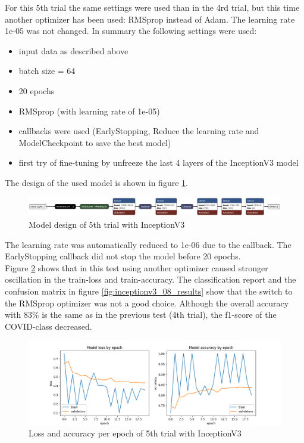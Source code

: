 \documentclass{article}
\begin{document}
For this 5th trial the same settings were used than in the 4rd trial, but this time another optimizer has been used: RMSprop instead of Adam. The learning rate 1e-05 was not changed. 
In summary the following settings were used: 
\begin{itemize}
\item input data as described above
\item batch size = 64
\item 20 epochs 
\item RMSprop (with learning rate of 1e-05)
\item callbacks were used (EarlyStopping, Reduce the learning rate and ModelCheckpoint to save the best model)
\item first try of fine-tuning by unfreeze the last 4 layers of the InceptionV3 model
\end{itemize}

The design of the used model is shown in figure \ref{fig:inceptionv3_08.keras_model_design}.
\begin{figure}%
    \centering
    \includegraphics[width=1.0\linewidth]{inceptionv3_08.keras_model_design_nice.png}
    \caption{Model design of 5th trial with InceptionV3}
    \label{fig:inceptionv3_08.keras_model_design}
\end{figure}

The learning rate was automatically reduced to 1e-06 due to the callback. The EarlyStopping callback did not stop the model before 20 epochs. \\
Figure \ref{fig:inceptionv3_08_loss_accuracy} shows that in this test using another optimizer caused stronger oscillation in the train-loss and train-accuracy. The classification report and the confusion matrix in figure \ref{fig:inceptionv3_08_results} show that the switch to the RMSprop optimizer was not a good choice. Although the overall accuracy with 83\% is the same as in the previous test (4th trial), the f1-score of the COVID-class decreased.\\ 

\begin{figure}%
    \centering
    \includegraphics[width=1.0\linewidth]{inceptionv3_08_loss_accuracy.png}
    \caption{Loss and accuracy per epoch of 5th trial with InceptionV3}
    \label{fig:inceptionv3_08_loss_accuracy}
\end{figure}
\end{document}
